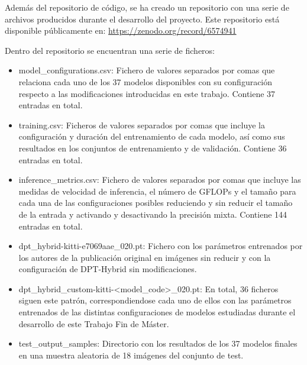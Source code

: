 
Además del repositorio de código, se ha creado un repositorio con una serie de archivos producidos durante el desarrollo del proyecto. Este repositorio está disponible públicamente en: \url{https://zenodo.org/record/6574941}

Dentro del repositorio se encuentran una serie de ficheros:

\begin{itemize}
\item model{\_}configurations.csv: Fichero de valores separados por comas que relaciona cada uno de los 37 modelos disponibles con su configuración respecto a las modificaciones introducidas en este trabajo. Contiene 37 entradas en total.
\item training.csv: Ficheros de valores separados por comas que incluye la configuración y duración del entrenamiento de cada modelo, así como sus resultados en los conjuntos de entrenamiento y de validación. Contiene 36 entradas en total.
\item inference{\_}metrics.csv: Fichero de valores separados por comas que incluye las medidas de velocidad de inferencia, el número de GFLOPs y el tamaño para cada una de las configuraciones posibles reduciendo y sin reducir el tamaño de la entrada y activando y desactivando la precisión mixta. Contiene 144 entradas en total.
\item dpt{\_}hybrid-kitti-e7069aae{\_}020.pt: Fichero con los parámetros entrenados por los autores de la publicación original en imágenes sin reducir y con la configuración de DPT-Hybrid sin modificaciones.
\item dpt{\_}hybrid{\_}custom-kitti-<model{\_}code>{\_}020.pt: En total, 36 ficheros siguen este patrón, correspondiendose cada uno de ellos con las parámetros entrenados de las distintas configuraciones de modelos estudiadas durante el desarrollo de este Trabajo Fin de Máster.
\item test{\_}output{\_}samples: Directorio con los resultados de los 37 modelos finales en una muestra aleatoria de 18 imágenes del conjunto de test.
\end{itemize}